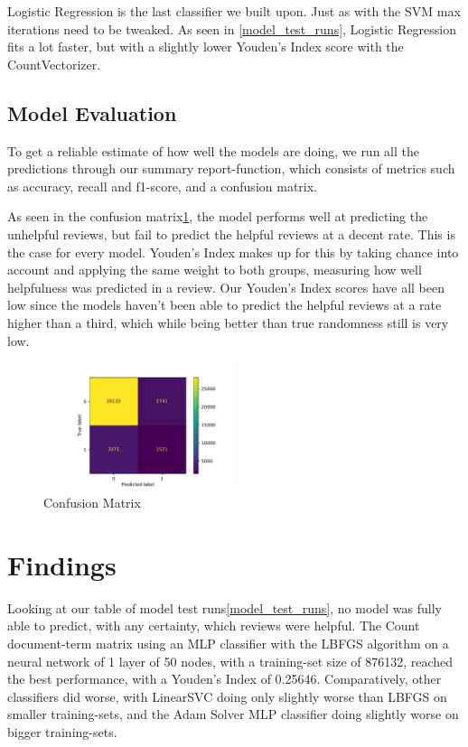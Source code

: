 \documentclass[twoside,twocolumn]{article}
\begin{document}
Logistic Regression is the last classifier we built upon. Just as with the SVM max iterations need to be tweaked. As seen in \figurename{\ref{model_test_runs}}, Logistic Regression fits a lot faster, but with a slightly lower Youden’s Index score with the CountVectorizer.

\subsection{Model Evaluation}
To get a reliable estimate of how well the models are doing, we run all the predictions through our summary report-function, which consists of metrics such as accuracy, recall and f1-score, and a confusion matrix.

As seen in the confusion matrix\ref{fig:confusion_matrix}, the model performs well at predicting the unhelpful reviews, but fail to predict the helpful reviews at a decent rate. This is the case for every model. Youden's Index makes up for this by taking chance into account and applying the same weight to both groups, measuring how well helpfulness was predicted in a review. Our Youden's Index scores have all been low since the models haven't been able to predict the helpful reviews at a rate higher than a third, which while being better than true randomness still is very low.

\begin{figure}[h]
	\centering
	\includegraphics[width=0.5\textwidth]{img/tm_mlp_lbgfs_confusion_matrix.pdf}
	\caption{Confusion Matrix}
	\label{fig:confusion_matrix}
\end{figure}


\section{Findings}

Looking at our table of model test runs\ref{model_test_runs}, no model was fully able to predict, with any certainty, which reviews were helpful. The Count document-term matrix using an MLP classifier with the LBFGS algorithm on a neural network of 1 layer of 50 nodes, with a training-set size of 876132, reached the best performance, with a Youden’s Index of 0.25646. Comparatively, other classifiers did worse, with LinearSVC doing only slightly worse than LBFGS on smaller training-sets, and the Adam Solver MLP classifier doing slightly worse on bigger training-sets.
\end{document}
